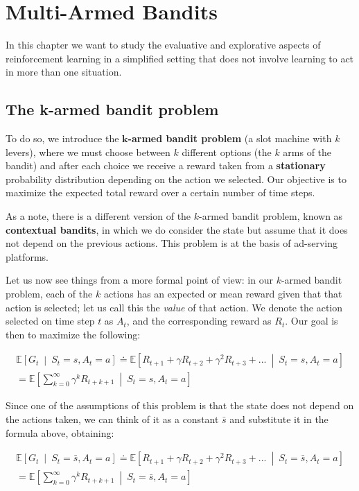 \chapter{Multi-Armed Bandits}
In this chapter we want to study the evaluative and explorative aspects of reinforcement learning in a simplified setting that does not involve learning to act in more than one situation.

\section{The k-armed bandit problem}
To do so, we introduce the \textbf{$\boldsymbol{k}$-armed bandit problem} (a slot machine with $k$ levers), where we must choose between $k$ different options (the $k$ arms of the bandit) and after each choice we receive a reward taken from a \textbf{stationary} probability distribution depending on the action we selected. Our objective is to maximize the expected total reward over a certain number of time steps.

As a note, there is a different version of the $k$-armed bandit problem, known as \textbf{contextual bandits}, in which we do consider the state but assume that it does not depend on the previous actions. This problem is at the basis of ad-serving platforms.

Let us now see things from a more formal point of view: in our $k$-armed bandit problem, each of the $k$ actions has an expected or mean reward given that that action is selected; let us call this the \textit{value} of that action. We denote the action selected on time step $t$ as $A_t$, and the corresponding reward as $R_t$. Our goal is then to maximize the following:

\begin{gather*}
    \mathbb{E} \left[ G_t \  \middle\vert \  S_t = s, A_t = a \right] \doteq \mathbb{E} \left[ R_{t+1} + \gamma R_{t+2} + \gamma^2 R_{t+3} + ... \  \middle\vert \  S_t = s, A_t = a \right] \\
    = \mathbb{E} \left[ \sum_{k=0}^{\infty} \gamma^k R_{t+k+1} \  \middle\vert \  S_t = s, A_t = a \right]
\end{gather*}

Since one of the assumptions of this problem is that the state does not depend on the actions taken, we can think of it as a constant $\bar{s}$ and substitute it in the formula above, obtaining:

\begin{gather*}
    \mathbb{E} \left[ G_t \  \middle\vert \  S_t = \bar{s}, A_t = a \right] \doteq \mathbb{E} \left[ R_{t+1} + \gamma R_{t+2} + \gamma^2 R_{t+3} + ... \  \middle\vert \  S_t = \bar{s}, A_t = a \right] \\
    = \mathbb{E} \left[ \sum_{k=0}^{\infty} \gamma^k R_{t+k+1} \  \middle\vert \  S_t = \bar{s}, A_t = a \right]
\end{gather*}

